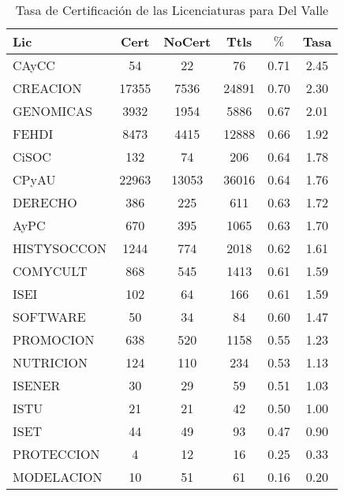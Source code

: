 \documentclass[12pt]{article}
\begin{document}
\begin{table}[h]
\centering
\begin{tabular}{|l|cc|c|cc|}\hline\hline
Lic & Cert & NoCert & Ttls & $\%$ & Tasa \\\hline\hline
CAyCC & 54 & 22 & 76 & 0.71 & 2.45 \\
CREACION & 17355 & 7536 & 24891 & 0.70 & 2.30 \\
GENOMICAS & 3932 & 1954 & 5886 & 0.67 & 2.01 \\\hline\hline
FEHDI & 8473 & 4415 & 12888 & 0.66 & 1.92 \\
CiSOC & 132 & 74 & 206 & 0.64 & 1.78 \\
CPyAU & 22963 & 13053 & 36016 & 0.64 & 1.76 \\
DERECHO & 386 & 225 & 611 & 0.63 & 1.72 \\
AyPC & 670 & 395 & 1065 & 0.63 & 1.70 \\
HISTYSOCCON & 1244 & 774 & 2018 & 0.62 & 1.61 \\
COMYCULT & 868 & 545 & 1413 & 0.61 & 1.59 \\
ISEI & 102 & 64 & 166 & 0.61 & 1.59 \\\hline\hline
SOFTWARE & 50 & 34 & 84 & 0.60 & 1.47 \\
PROMOCION & 638 & 520 & 1158 & 0.55 & 1.23 \\
NUTRICION & 124 & 110 & 234 & 0.53 & 1.13 \\
ISENER & 30 & 29 & 59 & 0.51 & 1.03 \\
ISTU & 21 & 21 & 42 & 0.50 & 1.00 \\\hline\hline
ISET & 44 & 49 & 93 & 0.47 & 0.90 \\
PROTECCION & 4 & 12 & 16 & 0.25 & 0.33 \\
MODELACION & 10 & 51 & 61 & 0.16 & 0.20 \\\hline\hline
\end{tabular}
\caption{Tasa de Certificación de las Licenciaturas para Del Valle}
\end{table}
\end{document}
